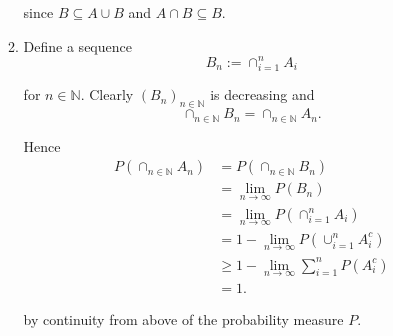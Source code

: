 \begin{enumerate}[label = \textbf{Exercise \arabic*.},wide = 0pt, itemsep=1.5ex]
\begin{enumerate}[label = \arabic*.,wide = 0pt, itemsep=1.5ex]
			\noindent since $B \subseteq A \cup B$ and $A \cap B \subseteq B$.
		\item Define a sequence 
			\begin{equation*}
				B_n := \cap_{i = 1}^n A_i
			\end{equation*}

			\noindent for $n \in \mathbb{N}$. Clearly $(B_n)_{n \in \mathbb{N}}$ is decreasing and 
			\begin{equation*}
				\cap_{n \in \mathbb{N}}B_n = \cap_{n \in \mathbb{N}} A_n.
			\end{equation*}

			Hence 
			\begin{align*}
				P(\cap_{n \in \mathbb{N}} A_n) &= P(\cap_{n \in \mathbb{N}}B_n)\\
				&= \lim_{n \to \infty} P(B_n)\\
				&= \lim_{n \to \infty} P(\cap_{i = 1}^n A_i)\\
				&= 1 - \lim_{n \to \infty} P(\cup_{i = 1}^nA_i^c)\\
				&\geq 1 - \lim_{n \to \infty} \sum_{i = 1}^n P(A_i^c)\\
				&= 1.
			\end{align*}

			\noindent by continuity from above of the probability measure $P$.
	\end{enumerate}
\end{enumerate}

